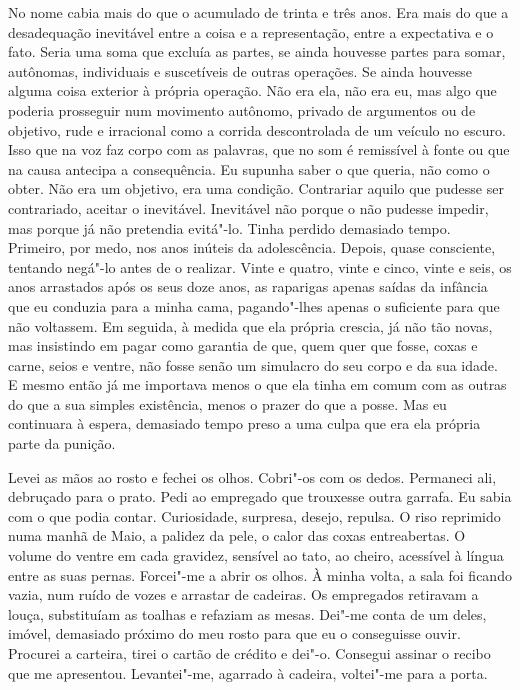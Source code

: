 No nome cabia mais do que o acumulado de trinta e três anos. Era mais do
que a desadequação inevitável entre a coisa e a representação, entre a
expectativa e o fato. Seria uma soma que excluía as partes, se ainda
houvesse partes para somar, autônomas, individuais e suscetíveis de
outras operações. Se ainda houvesse alguma coisa exterior à própria
operação. Não era ela, não era eu, mas algo que poderia prosseguir num
movimento autônomo, privado de argumentos ou de objetivo, rude e
irracional como a corrida descontrolada de um veículo no escuro. Isso
que na voz faz corpo com as palavras, que no som é remissível à fonte ou
que na causa antecipa a consequência. Eu supunha saber o que queria, não
como o obter. Não era um objetivo, era uma condição. Contrariar aquilo
que pudesse ser contrariado, aceitar o inevitável. Inevitável não porque
o não pudesse impedir, mas porque já não pretendia evitá"-lo. Tinha
perdido demasiado tempo. Primeiro, por medo, nos anos inúteis da
adolescência. Depois, quase consciente, tentando negá"-lo antes de o
realizar. Vinte e quatro, vinte e cinco, vinte e seis, os anos
arrastados após os seus doze anos, as raparigas apenas saídas da
infância que eu conduzia para a minha cama, pagando"-lhes apenas o
suficiente para que não voltassem. Em seguida, à medida que ela própria
crescia, já não tão novas, mas insistindo em pagar como garantia de que,
quem quer que fosse, coxas e carne, seios e ventre, não fosse senão um
simulacro do seu corpo e da sua idade. E mesmo então já me importava
menos o que ela tinha em comum com as outras do que a sua simples
existência, menos o prazer do que a posse. Mas eu continuara à espera,
demasiado tempo preso a uma culpa que era ela própria parte da punição.

Levei as mãos ao rosto e fechei os olhos. Cobri"-os com os dedos.
Permaneci ali, debruçado para o prato. Pedi ao empregado que trouxesse
outra garrafa. Eu sabia com o que podia contar. Curiosidade, surpresa,
desejo, repulsa. O riso reprimido numa manhã de Maio, a palidez da pele,
o calor das coxas entreabertas. O volume do ventre em cada gravidez,
sensível ao tato, ao cheiro, acessível à língua entre as suas pernas.
Forcei"-me a abrir os olhos. À minha volta, a sala foi ficando vazia,
num ruído de vozes e arrastar de cadeiras. Os empregados retiravam a
louça, substituíam as toalhas e refaziam as mesas. Dei"-me conta de um
deles, imóvel, demasiado próximo do meu rosto para que eu o conseguisse
ouvir. Procurei a carteira, tirei o cartão de crédito e dei"-o.
Consegui assinar o recibo que me apresentou. Levantei"-me, agarrado à
cadeira, voltei"-me para a porta.


